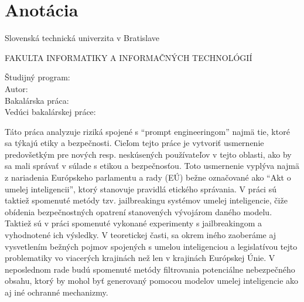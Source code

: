 \thispagestyle{empty}

\section*{Anotácia}

\begin{minipage}[t]{1\columnwidth}%
Slovenská technická univerzita v Bratislave

FAKULTA INFORMATIKY A INFORMAČNÝCH TECHNOLÓGIÍ

Študijný program: \hspace{1.4cm} \myStudyProgramSK\\

\noindent
Autor: \hspace{3.5cm} \myName \\
Bakalárska práca: \hspace{1.5cm} \myTitleSK \\
Vedúci bakalárskej práce: \hspace{0.12cm} \mySupervisor \\
\noindent
\myDateSK%
\end{minipage}

\bigskip{}

Táto práca analyzuje riziká spojené s ``prompt engineeringom'' najmä tie, ktoré sa týkajú etiky a bezpečnosti. Cieľom tejto práce je vytvoriť usmernenie predovšetkým pre nových resp. neskúsených používateľov v tejto oblasti, ako by sa mali správať v súlade s etikou a bezpečnosťou. Toto usmernenie vyplýva najmä z nariadenia Európskeho parlamentu a rady (EÚ) bežne označované ako ``Akt o umelej inteligencii'', ktorý stanovuje pravidlá etického správania. V práci sú taktiež spomenuté metódy tzv. jailbreakingu systémov umelej inteligencie, čiže obídenia bezpečnostných opatrení stanovených vývojárom daného modelu. Taktiež sú v práci spomenuté vykonané experimenty s jailbreakingom a vyhodnotené ich výsledky. V teoretickej časti, sa okrem iného zaoberáme aj vysvetlením bežných pojmov spojených s umelou inteligenciou a legislatívou tejto problematiky vo viacerých krajinách než len v krajinách Európskej Únie. V neposlednom rade budú spomenuté metódy filtrovania potenciálne nebezpečného obsahu, ktorý by mohol byť generovaný pomocou modelov umelej inteligencie ako aj iné ochranné mechanizmy.


\newpage{}\thispagestyle{empty}

\newpage
\thispagestyle{empty}
\mbox{}
\newpage

